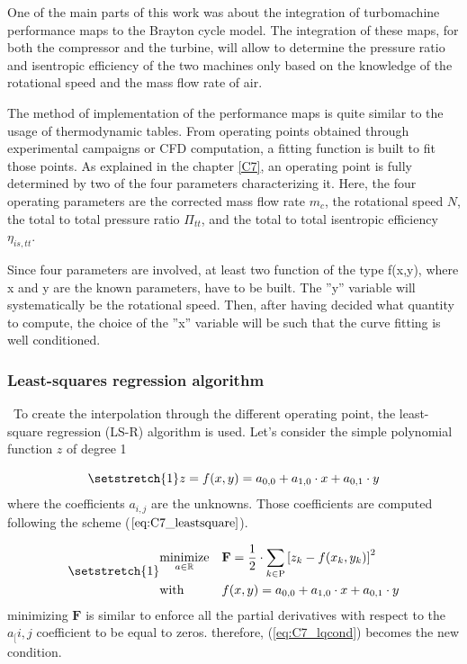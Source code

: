 One of the main parts of this work was about the integration of turbomachine performance maps to the Brayton cycle model. The integration of these maps, for both the compressor and the turbine, will allow to determine the pressure ratio and isentropic efficiency of the two machines only based on the knowledge of the rotational speed and the mass flow rate of air.

The method of implementation of the performance maps is quite similar to the usage of thermodynamic tables. From operating points obtained through experimental campaigns or CFD computation, a fitting function is built to fit those points. As explained in the chapter \ref{C7}, an operating point is fully determined by two of the four parameters characterizing it. Here, the four operating parameters are the corrected mass flow rate $m_c$, the rotational speed $N$, the total to total pressure ratio $\Pi_{tt}$, and the total to total isentropic efficiency $\eta_{is,tt}$. 

Since four parameters are involved, at least two function of the type f(x,y), where x and y are the known parameters, have to be built. The ''y'' variable will systematically be the rotational speed. Then, after having decided what quantity to compute, the choice of the ''x'' variable will be such that the curve fitting is well conditioned.
\subsubsection{Least-squares regression algorithm}
\quad\ To create the interpolation through the different operating point, the least-square regression (LS-R) algorithm is used. Let's consider the simple polynomial function $z$ of degree 1

\begin{equation*}
    \setstretch{1}
    z = f(x,y) = a_{0,0} + a_{1,0}\cdot x + a_{0,1}\cdot y
\end{equation*}
where the coefficients $a_{i,j}$ are the unknowns. Those coefficients are computed following the scheme ($\ref{eq:C7_leastsquare}$). 

\begin{equation}
\setstretch{1}
\begin{aligned}
& \underset{a\in\mathbb{R}}{\text{minimize}}
& &  \textbf{F} = \frac{1}{2}\cdot\sum_{k\in\textsc{P}}\left[z_k - f(x_k, y_k) \right]^2 \\
& \text{with}
& & f(x, y) = a_{0,0} + a_{1,0}\cdot x + a_{0,1}\cdot y
\end{aligned}\label{eq:C7_leastsquare}
\end{equation}
minimizing $\textbf{F}$ is similar to enforce all the partial derivatives with respect to the $a_[{i,j}$ coefficient to be equal to zeros. therefore, (\ref{eq:C7_lqcond}) becomes the new condition.

